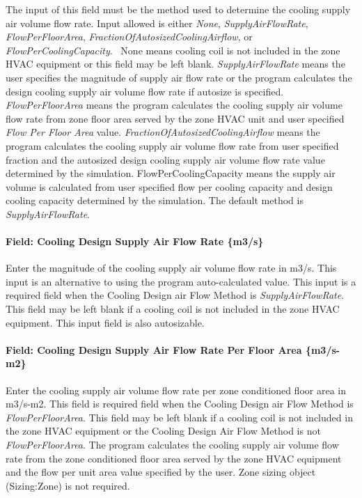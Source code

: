 The input of this field must be the method used to determine the cooling supply air volume flow rate. Input allowed is either \emph{None}, \emph{SupplyAirFlowRate}, \emph{FlowPerFloorArea}, \emph{FractionOfAutosizedCoolingAirflow}, or \emph{FlowPerCoolingCapacity}.~ None means cooling coil is not included in the zone HVAC equipment or this field may be left blank. \emph{SupplyAirFlowRate} means the user specifies the magnitude of supply air flow rate or the program calculates the design cooling supply air volume flow rate if autosize is specified. \emph{FlowPerFloorArea} means the program calculates the cooling supply air volume flow rate from zone floor area served by the zone HVAC unit and user specified \emph{Flow Per Floor Area} value. \emph{FractionOfAutosizedCoolingAirflow} means the program calculates the cooling supply air volume flow rate from user specified fraction and the autosized design cooling supply air volume flow rate value determined by the simulation. FlowPerCoolingCapacity means the supply air volume is calculated from user specified flow per cooling capacity and design cooling capacity determined by the simulation. The default method is \emph{SupplyAirFlowRate}.

\paragraph{Field: Cooling Design Supply Air Flow Rate \{m3/s\}}\label{field-cooling-design-supply-air-flow-rate-m3s}

Enter the magnitude of the cooling supply air volume flow rate in m3/s. This input is an alternative to using the program auto-calculated value. This input is a required field when the Cooling Design air Flow Method is \emph{SupplyAirFlowRate}. This field may be left blank if a cooling coil is not included in the zone HVAC equipment. This input field is also autosizable.

\paragraph{Field: Cooling Design Supply Air Flow Rate Per Floor Area \{m3/s-m2\}}\label{field-cooling-design-supply-air-flow-rate-per-floor-area-m3s-m2}

Enter the cooling supply air volume flow rate per zone conditioned floor area in m3/s-m2. This field is required field when the Cooling Design air Flow Method is \emph{FlowPerFloorArea}. This field may be left blank if a cooling coil is not included in the zone HVAC equipment or the Cooling Design Air Flow Method is not \emph{FlowPerFloorArea}. The program calculates the cooling supply air volume flow rate from the zone conditioned floor area served by the zone HVAC equipment and the flow per unit area value specified by the user. Zone sizing object (Sizing:Zone) is not required.

